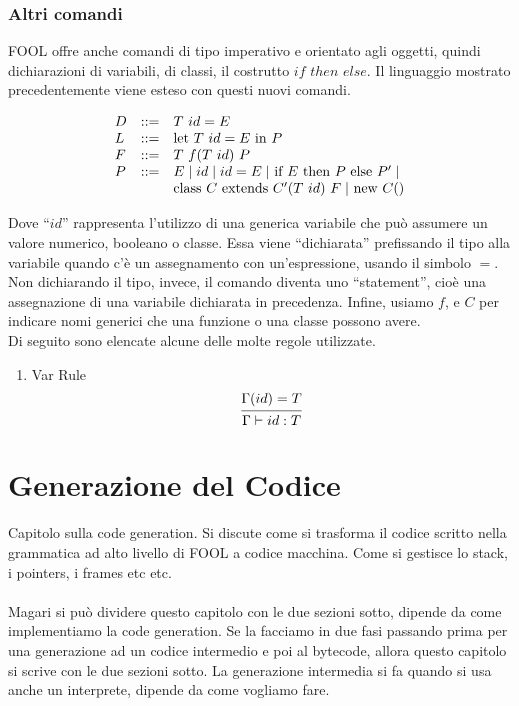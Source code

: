 \documentclass{scrreprt}
\begin{document}
\subsection{Altri comandi}

FOOL offre anche comandi di tipo imperativo e orientato agli oggetti, quindi dichiarazioni di variabili, di classi, il costrutto $if$ $then$ $else$.
Il linguaggio mostrato precedentemente viene esteso con questi nuovi comandi.

\[
\begin{array}{lcl}
    D &::=& T$ $id = E\\
    L &::= & $let $T$ $id = E$ in $P \\
    F & ::= & T$ $f(T$ $id)$ $ P\\
    P & ::= & E \mid id \mid id = E \mid $ if $ E $ then $ P $ else $ P' \mid\\
& & $class $C$ extends $C'(T$ $id)$ $F \mid $ new $ C()\\ 
\end{array}
\]

Dove ``$id$'' rappresenta l'utilizzo di una generica variabile che può assumere un valore numerico, booleano o classe.
Essa viene ``dichiarata'' prefissando il tipo alla variabile quando c'è un assegnamento con un'espressione, usando il simbolo $=$. Non dichiarando 
il tipo, invece, il comando diventa uno ``statement'', cioè una assegnazione di una variabile dichiarata in precedenza.
Infine, usiamo $f$, e $C$ per indicare nomi generici che una funzione o una classe possono avere.\\

Di seguito sono elencate alcune delle molte regole utilizzate.

\begin{multicols}{2}
    \begin{enumerate}
        \item Var Rule
    \[
        \begin{prooftree}
            \hypo {\Gamma(id) = T}
            \infer 1 {\Gamma \vdash id: T}
        \end{prooftree}\\
    \]
    \end{enumerate}
\end{multicols}

\chapter{Generazione del Codice}
Capitolo sulla code generation. Si discute come si trasforma il codice scritto nella grammatica
ad alto livello di FOOL a codice macchina. Come si gestisce lo stack, i pointers, i frames etc etc.\\
\\
Magari si può dividere questo capitolo con le due sezioni sotto, dipende da come implementiamo la code 
generation. Se la facciamo in due fasi passando prima per una generazione ad un codice intermedio e 
poi al bytecode, allora questo capitolo si scrive con le due sezioni sotto.
La generazione intermedia si fa quando si usa anche un interprete, dipende da come vogliamo fare.
\end{document}
